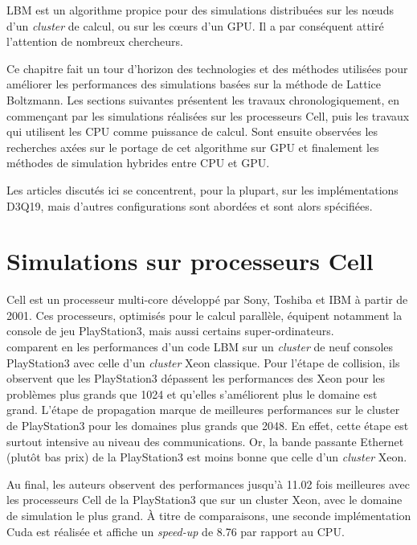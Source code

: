 \acs{LBM} est un algorithme propice pour des simulations distribuées sur les nœuds d'un \textit{cluster} de calcul, ou sur les cœurs d'un \acs{GPU}. Il a par conséquent attiré l'attention de nombreux chercheurs. 

Ce chapitre fait un tour d'horizon des technologies et des méthodes utilisées pour améliorer les performances des simulations basées sur la méthode de Lattice Boltzmann. Les sections suivantes présentent les travaux chronologiquement, en commençant par les simulations réalisées sur les processeurs Cell, puis les travaux qui utilisent les \acs{CPU} comme puissance de calcul. Sont ensuite  observées les recherches axées sur le portage de cet algorithme sur \acs{GPU} et finalement les méthodes de simulation hybrides entre \acs{CPU} et \acs{GPU}.

Les articles discutés ici se concentrent, pour la plupart, sur les implémentations D3Q19, mais d'autres configurations sont abordées et sont alors spécifiées.

\section{Simulations sur processeurs Cell}
Cell est un processeur multi-core développé par Sony, Toshiba et IBM à partir de 2001. Ces processeurs, optimisés pour le calcul parallèle, équipent notamment la console de jeu PlayStation3, mais aussi certains super-ordinateurs.\\

\citet{peng_parallel_2008} comparent en \citeyear{peng_parallel_2008} les performances d'un code \acs{LBM} sur un \textit{cluster} de neuf consoles PlayStation3 avec celle d'un \textit{cluster} Xeon classique. Pour l'étape de collision, ils observent que les PlayStation3 dépassent les performances des Xeon pour les problèmes plus grands que 1024 et qu'elles s'améliorent plus le domaine est grand. L'étape de propagation marque de meilleures performances sur le cluster de PlayStation3 pour les domaines plus grands que 2048. En effet, cette étape est surtout intensive au niveau des communications. Or, la bande passante Ethernet (plutôt bas prix) de la PlayStation3 est moins bonne que celle d'un \textit{cluster} Xeon.

Au final, les auteurs observent des performances jusqu'à 11.02 fois meilleures avec les processeurs Cell de la PlayStation3 que sur un cluster Xeon, avec le domaine de simulation le plus grand. À titre de comparaisons, une seconde implémentation Cuda est réalisée et affiche un \textit{speed-up} de 8.76 par rapport au \acs{CPU}.\\

